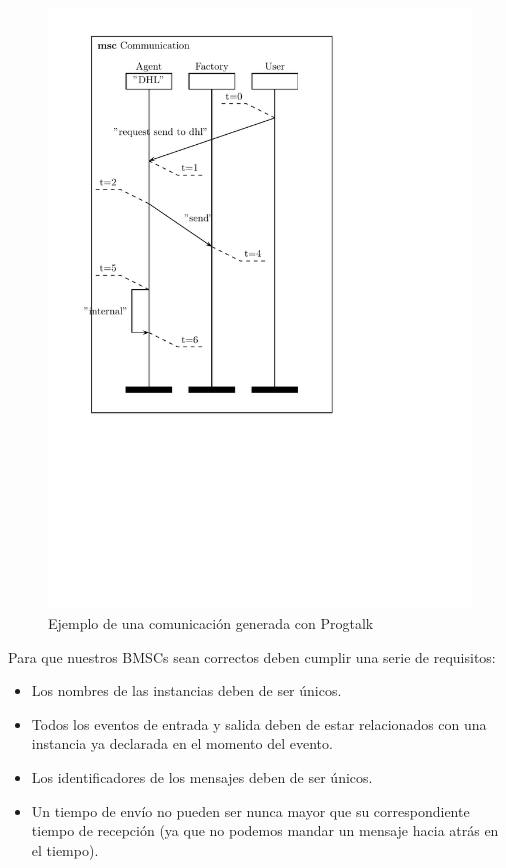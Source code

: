 \begin{figure}
  \centering
  \includegraphics[scale=1]{./images/lars}
  \caption{Ejemplo de una comunicación generada con Progtalk}
  \label{fig:fig1}
\end{figure}

Para que nuestros BMSCs sean correctos deben cumplir una serie de requisitos:
\begin{itemize}
\item Los nombres de las instancias deben de ser únicos.
\item Todos los eventos de entrada y salida deben de estar
  relacionados con una instancia ya declarada en el momento del
  evento.
\item Los identificadores de los mensajes deben de ser únicos.
\item Un tiempo de envío no pueden ser nunca mayor que su
  correspondiente tiempo de recepción (ya que no podemos mandar un
  mensaje hacia atrás en el tiempo).
\end{itemize}


